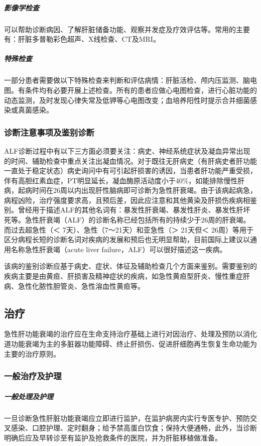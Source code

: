 \subparagraph{影像学检查}

可以帮助诊断病因、了解肝脏储备功能、观察并发症及疗效评估等。常用的主要有：肝脏多普勒彩色超声、X线检查、CT及MRI。

\subparagraph{特殊检查}

一部分患者需要做以下特殊检查来判断和评估病情：肝脏活检、颅内压监测、脑电图。有条件均有必要开展上述检查。所有的患者应做心电图检查，进行心脏功能的动态监测，及时发现心律失常及低钾等心电图改变；血培养阳性时提示合并细菌感染或真菌感染。

\subsubsection{诊断注意事项及鉴别诊断}

ALF诊断过程中有以下三方面必须要关注：病史、神经系统症状及凝血异常出现的时间、辅助检查中重点关注出凝血情况。对于既往无肝病史（有肝病史者肝功能一直处于稳定状态）病史询问中有可引起肝损害的诱因，当患者肝功能严重受损，伴有高胆红素血症，PT明显延长，凝血酶原活动度小于40\%，如能排除慢性肝病，起病时间在26周以内出现肝性脑病即可诊断为急性肝衰竭。由于该病起病急，病程凶险，治疗强度要求高，且预后差，因此应注意和其他黄染及肝损伤疾病相鉴别。曾经用于描述ALF的其他名词有：暴发性肝衰竭、暴发性肝炎、暴发性肝坏死等。急性肝衰竭（ALF）的诊断名称已经包括所有的持续少于26周的肝衰竭。而过去超急性（＜
7天）、急性（7～21天）和亚急性（＞ 21天但＜
26周）等用于区分病程长短的诊断名词对疾病的发展和预后也无明显帮助，目前国际上建议以通用名称急性肝衰竭（acute
liver failure，ALF）可以很好描述这一疾病。

该病的鉴别诊断应基于病史、症状、体征及辅助检查几个方面来鉴别。需要鉴别的疾病主要是由黄疸、肝损害及精神症状的疾病，如急性黄疸型肝炎、慢性重症肝病、急性化脓性胆管炎、急性溶血性黄疸等。

\subsection{治疗}

急性肝功能衰竭的治疗应在生命支持治疗基础上进行对因治疗、处理及预防以消化道功能衰竭为主的多脏器功能障碍、终止肝损伤、促进肝细胞再生恢复生命功能为主要的治疗原则。

\subsubsection{一般治疗及护理}

\subparagraph{一般处理及护理}

一旦诊断急性肝脏功能衰竭应立即进行监护，在监护病房内实行专医专护、预防交叉感染、口腔护理、定时翻身；给予禁高蛋白饮食；保持大便通畅，此外，当诊断明确后应及早转诊至有监护及抢救条件的医院，并为肝脏移植做准备。

